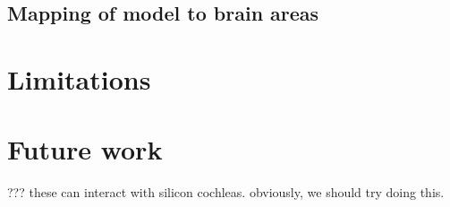 \subsection{Mapping of model to brain areas}





\section{Limitations}


\section{Future work}

??? these can interact with silicon cochleas.
obviously, we should try doing this.








